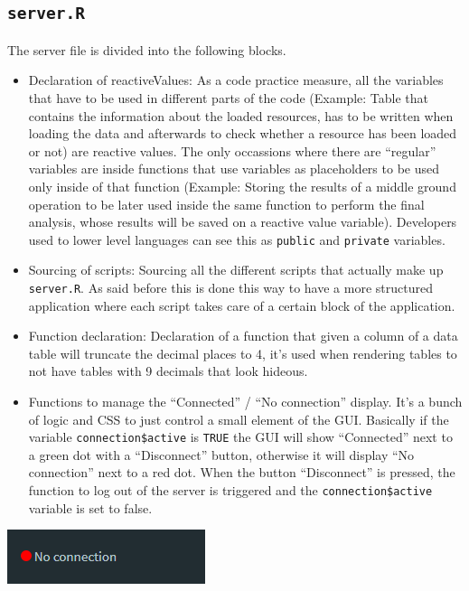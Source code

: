 \documentclass[
]{book}
\providecommand{\tightlist}{%
  \setlength{\itemsep}{0pt}\setlength{\parskip}{0pt}}
\begin{document}
\hypertarget{server.r}{%
\subsection{\texorpdfstring{\texttt{server.R}}{server.R}}\label{server.r}}

The server file is divided into the following blocks.

\begin{itemize}
\tightlist
\item
  Declaration of reactiveValues: As a code practice measure, all the variables that have to be used in different parts of the code (Example: Table that contains the information about the loaded resources, has to be written when loading the data and afterwards to check whether a resource has been loaded or not) are reactive values. The only occassions where there are ``regular'' variables are inside functions that use variables as placeholders to be used only inside of that function (Example: Storing the results of a middle ground operation to be later used inside the same function to perform the final analysis, whose results will be saved on a reactive value variable). Developers used to lower level languages can see this as \texttt{public} and \texttt{private} variables.
\item
  Sourcing of scripts: Sourcing all the different scripts that actually make up \texttt{server.R}. As said before this is done this way to have a more structured application where each script takes care of a certain block of the application.
\item
  Function declaration: Declaration of a function that given a column of a data table will truncate the decimal places to 4, it's used when rendering tables to not have tables with 9 decimals that look hideous.
\item
  Functions to manage the ``Connected'' / ``No connection'' display. It's a bunch of logic and CSS to just control a small element of the GUI. Basically if the variable \texttt{connection\$active} is \texttt{TRUE} the GUI will show ``Connected'' next to a green dot with a ``Disconnect'' button, otherwise it will display ``No connection'' next to a red dot. When the button ``Disconnect'' is pressed, the function to log out of the server is triggered and the \texttt{connection\$active} variable is set to false.
\end{itemize}

\includegraphics{images/dev1.png}
\end{document}
